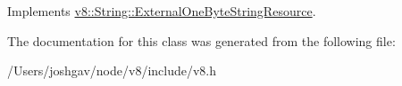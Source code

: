 Implements \hyperlink{classv8_1_1_string_1_1_external_one_byte_string_resource_aa1db65afab54efe13daf6bd39f2ad265}{v8\+::\+String\+::\+External\+One\+Byte\+String\+Resource}.



The documentation for this class was generated from the following file\+:\begin{DoxyCompactItemize}
\item 
/\+Users/joshgav/node/v8/include/v8.\+h\end{DoxyCompactItemize}
